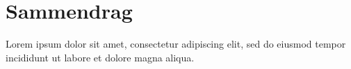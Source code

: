 \chapter*{Sammendrag}
\label{ch:Sammendrag}

Lorem ipsum dolor sit amet, consectetur adipiscing elit, sed do eiusmod tempor incididunt ut labore et dolore magna aliqua.